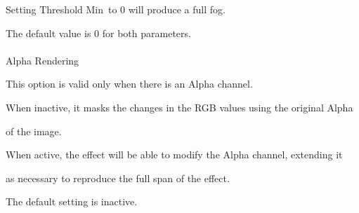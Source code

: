 \documentclass[a4paper,12pt]{article}
\begin{document}
Setting \textquotedbl Threshold Min\textquotedbl \ to 0 will produce a full fog.\\
\par
The default value is 0 for both parameters.\\
\\
Alpha Rendering\par
This option is valid only when there is an Alpha channel.\par
When inactive, it masks the changes in the RGB values using the original Alpha\par 
of the image.\par
When active, the effect will be able to modify the Alpha channel, extending it\par 
as necessary to reproduce the full span of the effect.\par
The default setting is inactive.
\end{document}
